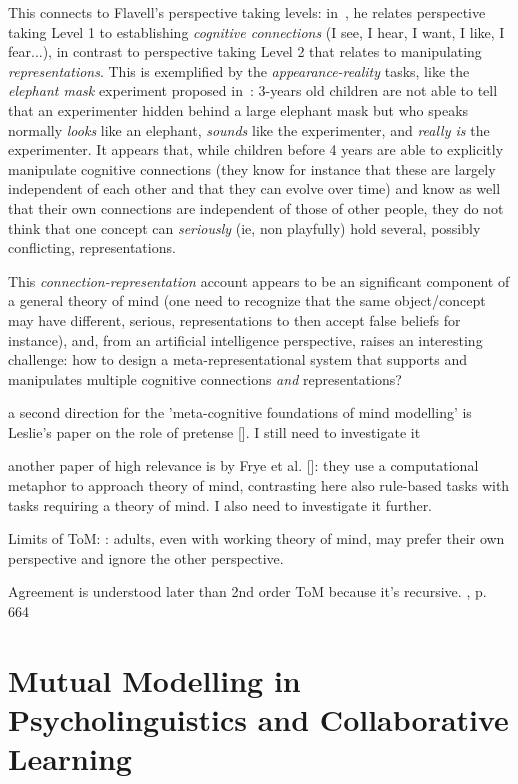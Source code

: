 \documentclass{sig-alternate}
\begin{document}
This connects to Flavell's perspective taking levels:
in~\cite{flavell1990developmental}, he relates perspective taking Level 1 to
establishing \emph{cognitive connections} (I see, I hear, I want, I like, I
fear...), in contrast to perspective taking Level 2 that relates to manipulating
\emph{representations}.  This is exemplified by the \emph{appearance-reality}
tasks, like the \emph{elephant mask} experiment proposed
in~\cite{flavell1990developmental}: 3-years old children are not able to tell
that an experimenter hidden behind a large elephant mask but who speaks normally
\emph{looks} like an elephant, \emph{sounds} like the experimenter, and
\emph{really is} the experimenter.  It appears that, while children before 4
years are able to explicitly manipulate cognitive connections (they know for
instance that these are largely independent of each other and that they can
evolve over time) and know as well that their own connections are independent of
those of other people, they do not think that one concept can \emph{seriously}
(ie, non playfully) hold several, possibly conflicting, representations.

This \emph{connection-representation} account appears to be an significant
component of a general theory of mind (one need to recognize that the same
object/concept may have different, serious, representations to then accept false
beliefs for instance), and, from an artificial intelligence perspective, raises
an interesting challenge: how to design a meta-representational system
that supports and manipulates multiple cognitive connections \emph{and}
representations?

a second direction for the 'meta-cognitive foundations of mind modelling' is
Leslie's paper on the role of pretense []. I still need to investigate it

another paper of high relevance is by Frye et al. []: they use a computational
metaphor to approach theory of mind, contrasting here also
rule-based tasks with tasks requiring a theory of mind. I also need to
investigate it further.

Limits of ToM:
\cite{keysar2003limits}: adults, even with working theory of mind, may prefer
their own perspective and ignore the other perspective.

Agreement is understood later than 2nd order ToM because it's recursive.
\cite{verbrugge2009logic}, p. 664

\section{Mutual Modelling in Psycholinguistics and Collaborative Learning}
\end{document}
